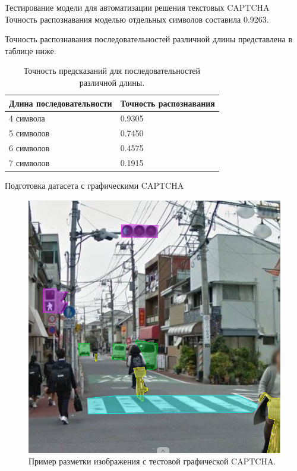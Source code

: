 \documentclass[12pt,a4paper,mathserif]{beamer}
\begin{document}
\begin{frame}{\footnotesize Тестирование модели для автоматизации решения текстовых CAPTCHA}
    \setlength{\parindent}{0.5cm}
    Точность распознавания моделью отдельных символов составила 0.9263.

    Точность распознавания последовательностей различной длины представлена в 
    таблице ниже.

    \begin{table}[H]
        \centering
        \caption{Точность предсказаний для последовательностей различной длины.}
        \begin{tabular}{|l|l|}
            \hline
            Длина последовательности & Точность распознавания \\
            \hline
            4 символа & 0.9305 \\
            \hline
            5 символов & 0.7450 \\
            \hline
            6 символов & 0.4575 \\
            \hline
            7 символов & 0.1915 \\
            \hline
        \end{tabular}
    \end{table}
\end{frame}

\begin{frame}{\large Подготовка датасета с графическими CAPTCHA}
    \begin{figure}
        \centering
        \includegraphics[width=0.55\linewidth]{imgs/captcha-poligons.png}
        \caption{Пример разметки изображения с тестовой графической CAPTCHA.}
    \end{figure}
\end{frame}
\end{document}
